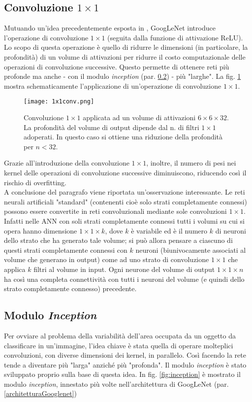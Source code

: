 \subsection{Convoluzione $1\times 1$}
\label{1x1conv}
Mutuando un'idea precedentemente esposta in \cite{NiN}, GoogLeNet introduce l'operazione di convoluzione $1\times 1$ (seguita dalla funzione di attivazione ReLU). Lo scopo di questa operazione è quello di ridurre le dimensioni (in particolare, la profondità) di un volume di attivazioni per ridurre il costo computazionale delle operazioni di convoluzione successive. Questo permette di ottenere reti più profonde ma anche - con il modulo \textit{inception} (par. \ref{inception}) - più "larghe".
La fig. \ref{fig:1x1conv} mostra schematicamente l'applicazione di un'operazione di convoluzione $1\times 1$.

\begin{figure}[h] 
\centering
\texttt{[image: 1x1conv.png]}
\caption{Convoluzione $1\times 1$ applicata ad un volume di attivazioni $6\times 6\times 32$. La profondità del volume di output dipende dal n. di filtri $1\times 1$ adoperati. In questo caso si ottiene una riduzione della profondità per $n<32$.}
\label{fig:1x1conv}
\end{figure}

Grazie all'introduzione della convoluzione $1\times 1$, inoltre, il numero di pesi nei kernel delle operazioni di convoluzione successive diminuiscono, riducendo così il rischio di overfitting.\\

A conclusione del paragrafo viene riportata un'osservazione interessante. Le reti neurali artificiali "standard" (contenenti cioè solo strati completamente connessi) possono essere convertite in reti convoluzionali mediante sole convoluzioni $1\times 1$. Infatti nelle ANN con soli strati completamente connessi tutti i volumi su cui si opera hanno dimensione $1\times 1\times k$, dove $k$ è variabile ed è il numero $k$ di neuroni dello strato che ha generato tale volume; si può allora pensare a ciascuno di questi strati completamente connessi con $k$ neuroni (biunivocamente associati al volume che generano in output) come ad uno strato di convoluzione $1\times 1$ che applica $k$ filtri al volume in input. Ogni neurone del volume di output $1\times 1\times n$ ha così una completa connettività con tutti i neuroni del volume (e quindi dello strato completamente connesso) precedente.

\subsection{Modulo \textit{Inception}}
\label{inception}
Per ovviare al problema della variabilità dell'area occupata da un oggetto da classificare in un'immagine, l'idea chiave è stata quella di operare molteplici convoluzioni, con diverse dimensioni dei kernel, in parallelo.
Così facendo la rete tende a diventare più "larga" anziché più "profonda".
Il modulo \textit{inception} è stato sviluppato proprio sulla base di questa idea.
In fig. \ref{fig:inception} è mostrato il modulo \textit{inception}, innestato più volte nell'architettura di GoogLeNet (par. \ref{architetturaGooglenet})


